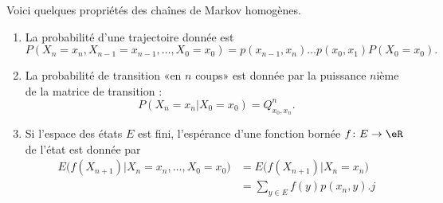 \begin{proposition}
    Voici quelques propriétés des chaînes de Markov homogènes.
    \begin{enumerate}
        \item
            La probabilité d'une trajectoire donnée est
            \begin{equation}
                P(X_n=x_n,X_{n-1}=x_{n-1},\ldots,X_0=x_0)=p(x_{n-1},x_n)\dots p(x_0,x_1)P(X_0=x_0).
            \end{equation}
        \item
            La probabilité de transition «en \( n\) coups» est donnée par la puissance \( n\)ième de la matrice de transition :
            \begin{equation}
                P(X_n=x_n|X_0=x_0)=Q^n_{x_0,x_n}.
            \end{equation}
        \item
            Si l'espace des états \( E\) est fini, l'espérance d'une fonction bornée \( f\colon E\to \eR\) de l'état est donnée par
            \begin{subequations}
                \begin{align}
                    E\big( f(X_{n+1})|X_n=x_n,\ldots,X_0=x_0 \big)&=E\big( f(X_{n+1})|X_n=x_n \big)\\
                    &=\sum_{y\in E}f(y)p(x_n,y).j
                \end{align}
            \end{subequations}
    \end{enumerate}
\end{proposition}

